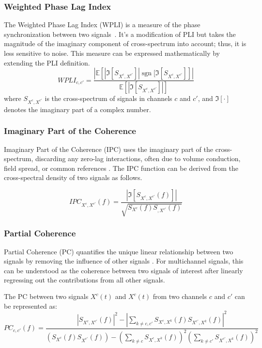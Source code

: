 \subsubsection{Weighted Phase Lag Index}
The Weighted Phase Lag Index (WPLI) is a measure of the phase synchronization between two signals~\cite{gonzalez2020network}. It's a modification of PLI but takes the magnitude of the imaginary component of cross-spectrum into account; thus, it is less sensitive to noise. This measure can be expressed mathematically by extending the PLI definition.
\begin{equation}
    WPLI_{c, c'} = \frac{| \mathbb{E} \left[ | \Im[ S_{X^{c},X^{c'}} ] | \operatorname{sgn}[\Im[ S_{X^{c},X^{c'}} ] \right] |}{ \mathbb{E} \left[| \Im[ S_{X^{c},X^{c'}} ] | \right]}
\end{equation}
where $S_{X^{c},X^{c'}}$ is the cross-spectrum of signals in channels $c$ and $c'$, and $\Im[\cdot]$ denotes the imaginary part of a complex number. 

\subsubsection{Imaginary Part of the Coherence}

Imaginary Part of the Coherence (IPC) uses the imaginary part of the cross-spectrum, discarding any zero-lag interactions, often due to volume conduction, field spread, or common references \cite{cao2022brain}.
The IPC function can be derived from the cross-spectral density of two signals as follows.

\begin{equation}
    IPC_{X^{c},X^{c'}}(f) =  \frac{|\Im[S_{X^{c},X^{c'}}(f)]|}{\sqrt{S_{X^{c}}(f)S_{,X^{c'}}(f)}}
\end{equation}

\subsubsection{Partial Coherence}
Partial Coherence (PC) quantifies the unique linear relationship between two signals by removing the influence of other signals \cite{gonzalez2020network}. For multichannel signals, this can be understood as the coherence between two signals of interest after linearly regressing out the contributions from all other signals. 

The PC between two signals $X^{c}(t)$ and $X^{c}(t)$ from two channels $c$ and $c'$ can be represented as:
\begin{equation}
    PC_{c,c'}(f) = \frac{|S_{X^{c},X^{c'}}(f)|^2 - |\sum_{k\neq c,c'}S_{X^{c},X^{k}}(f)S_{X^{c'},X^{k}}(f)|^2}{(S_{X^{c}}(f)S_{X^{c'}}(f)) - (\sum_{k\neq c}S_{X^{c},X^{k}}(f))^2 (\sum_{k\neq c'}S_{X^{c'},X^{k}}(f))^2}
\end{equation}

